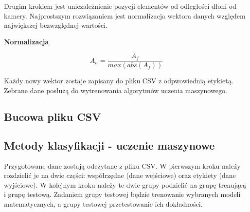    
    \quad Drugim krokiem jest uniezależnienie pozycji elementów od odległości dłoni od kamery. Najprostszym rozwiązaniem jest normalizacja wektora danych względem największej bezwzględnej wartości. 
    
    \quad \textbf{Normalizacja}
    
    
    
    \begin{equation*}
        A_n=\dfrac{A_f}{max(abs(A_f))}
    \end{equation*}
    
    \quad Każdy nowy wektor zostaje zapisany do pliku CSV z odpwowiednią etykietą. Zebrane dane posłużą do wytrenowania algorytmów uczenia maszynowego.     
    
    \subsection{Bucowa pliku CSV}

    \subsection{Metody klasyfikacji - uczenie maszynowe}
    
    \quad Przygotowane dane zostają odczytane z pliku CSV. W pierwszym kroku należy rozdzielić je na dwie części: współrzędne (dane wejściowe) oraz etykiety (dane wyjściowe). W kolejnym kroku należy te dwie grupy podzielić na grupę trenującą i grupę testową. Zadaniem grupy testowej będzie trenowanie wybranych modeli matematycznych, a grupy testowej przetestowanie ich dokładności. 

